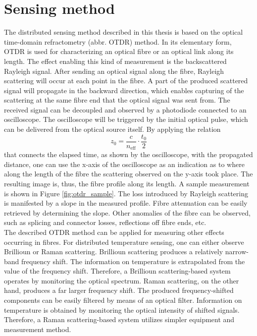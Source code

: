 \documentclass{standalone}
\begin{document}
\chapter{Sensing method}
\setcounter{page}\thestranica


The distributed sensing method described in this thesis is based on the optical time-domain refractometry (abbr. OTDR) method. In its elementary form, OTDR is used for characterizing an optical fibre or an optical link along its length. The effect enabling this kind of measurement is the backscattered Rayleigh signal. After sending an optical signal along the fibre, Rayleigh scattering will occur at each point in the fibre. A part of the produced scattered signal will propagate in the backward direction, which enables capturing of the scattering at the same fibre end that the optical signal was sent from. The received signal can be decoupled and observed by a photodiode connected to an oscilloscope. The oscilloscope will be triggered by the initial optical pulse, which can be delivered from the optical source itself. By applying the relation 
\begin{equation} \label{eq:otdr_time_distance}
z_0 = \frac{c}{n_\textrm{eff}} \cdot \frac{t_0}{2}
\end{equation}
that connects the elapsed time, as shown by the oscilloscope, with the propagated distance, one can use the x-axis of the oscilloscope as an indication as to where along the length of the fibre the scattering observed on the y-axis took place. The resulting image is, thus, the fibre profile along its length. A sample measurement is shown in Figure \ref{fig:otdr_sample}.
The loss introduced by Rayleigh scattering is manifested by a slope in the measured profile. Fibre attenuation can be easily retrieved by determining the slope. Other anomalies of the fibre can be observed, such as splicing and connector losses, reflections off fibre ends, etc. 
\\

The described OTDR method can be applied for measuring other effects occurring in fibres. For distributed temperature sensing, one can either observe Brillioun or Raman scattering. Brillioun scattering produces a relatively narrow-band frequency shift. The information on temperature is extrapolated from the value of the frequency shift. Therefore, a Brillioun scattering-based system operates by monitoring the optical spectrum. Raman scattering, on the other hand, produces a far larger frequency shift. The produced frequency-shifted components can be easily filtered by means of an optical filter. Information on temperature is obtained by monitoring the optical intensity of shifted signals. Therefore, a Raman scattering-based system utilizes simpler equipment and measurement method. 





\setcounter{stranica}{\thepage}
\addtocounter{stranica}{1}
\end{document}
